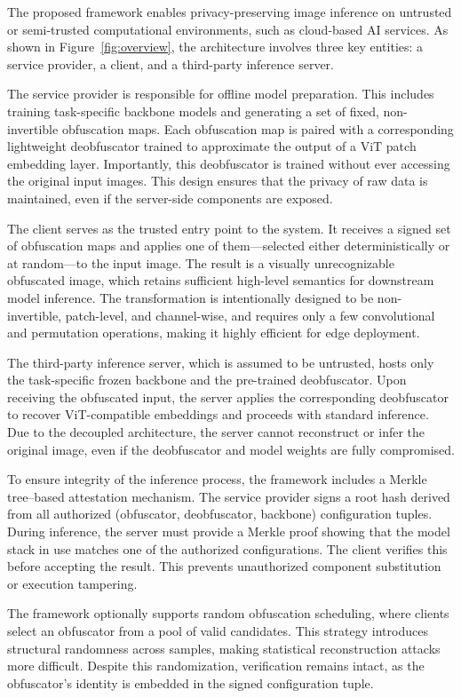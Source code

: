 \documentclass{ieeeaccess}
\begin{document}
The proposed framework enables privacy-preserving image inference on untrusted or semi-trusted computational environments, such as cloud-based AI services. As shown in Figure~\ref{fig:overview}, the architecture involves three key entities: a service provider, a client, and a third-party inference server.

The service provider is responsible for offline model preparation. This includes training task-specific backbone models and generating a set of fixed, non-invertible obfuscation maps. Each obfuscation map is paired with a corresponding lightweight deobfuscator trained to approximate the output of a ViT patch embedding layer. Importantly, this deobfuscator is trained without ever accessing the original input images. This design ensures that the privacy of raw data is maintained, even if the server-side components are exposed.

The client serves as the trusted entry point to the system. It receives a signed set of obfuscation maps and applies one of them—selected either deterministically or at random—to the input image. The result is a visually unrecognizable obfuscated image, which retains sufficient high-level semantics for downstream model inference. The transformation is intentionally designed to be non-invertible, patch-level, and channel-wise, and requires only a few convolutional and permutation operations, making it highly efficient for edge deployment.

The third-party inference server, which is assumed to be untrusted, hosts only the task-specific frozen backbone and the pre-trained deobfuscator. Upon receiving the obfuscated input, the server applies the corresponding deobfuscator to recover ViT-compatible embeddings and proceeds with standard inference. Due to the decoupled architecture, the server cannot reconstruct or infer the original image, even if the deobfuscator and model weights are fully compromised.

To ensure integrity of the inference process, the framework includes a Merkle tree–based attestation mechanism. The service provider signs a root hash derived from all authorized (obfuscator, deobfuscator, backbone) configuration tuples. During inference, the server must provide a Merkle proof showing that the model stack in use matches one of the authorized configurations. The client verifies this before accepting the result. This prevents unauthorized component substitution or execution tampering.

The framework optionally supports random obfuscation scheduling, where clients select an obfuscator from a pool of valid candidates. This strategy introduces structural randomness across samples, making statistical reconstruction attacks more difficult. Despite this randomization, verification remains intact, as the obfuscator’s identity is embedded in the signed configuration tuple.
\end{document}
